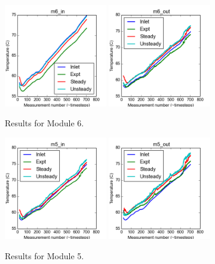 \documentclass{article}
\begin{document}
\begin{figure}[!ht]
\centering
\includegraphics[width=0.4\textwidth]{../../data/ICSolar/images/Feb11_m6_in_compare.png}\hspace{0.05\textwidth}
\includegraphics[width=0.4\textwidth]{../../data/ICSolar/images/Feb11_m6_out_compare.png}\hspace{0.05\textwidth}\\
\caption{Results for Module 6.}\end{figure}
\begin{figure}[!ht]
\centering
\includegraphics[width=0.4\textwidth]{../../data/ICSolar/images/Feb11_m5_in_compare.png}\hspace{0.05\textwidth}
\includegraphics[width=0.4\textwidth]{../../data/ICSolar/images/Feb11_m5_out_compare.png}\hspace{0.05\textwidth}\\
\caption{Results for Module 5.}\end{figure}
\end{document}
